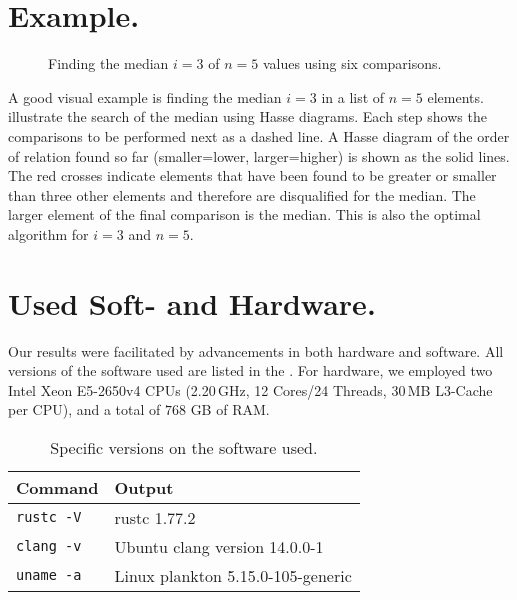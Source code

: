 \documentclass[twoside,leqno,twocolumn]{article}
\begin{document}
\clearpage
\appendix


\section{Example.}
\begin{figure}[!b]
  \centering
  
  \caption{Finding the median $i = 3$ of $n = 5$ values using six comparisons.}
  \label{fig:median_of_5}
\end{figure}
A good visual example is finding the median $i = 3$ in a list of $n = 5$ elements.
 illustrate the search of the median using Hasse diagrams.
Each step shows the comparisons to be performed next as a dashed line.
A Hasse diagram of the order of relation found so far (smaller=lower, larger=higher) is shown as the solid lines.
The red crosses indicate elements that have been found to be greater or smaller than three other elements and therefore are disqualified for the median.
The larger element of the final comparison is the median.
This is also the optimal algorithm for $i = 3$ and $n = 5$.






\section{Used Soft- and Hardware.} \label{sec:hardware}

Our results were facilitated by advancements in both hardware and software.
All versions of the software used are listed in the .
For hardware, we employed two Intel Xeon E5-2650v4 CPUs (2.20\,GHz, 12 Cores/24 Threads, 30\,MB L3-Cache per CPU), and a total of $768$ GB of RAM.

\begin{table}[!t]
  \renewcommand{\arraystretch}{1.1}
  \caption{Specific versions on the software used.}
  \label{table:command_outputs}
  \centering
  \small
  \begin{tabular}{l|l}
    \textbf{Command}  & \textbf{Output}                   \\ \hline
    \texttt{rustc -V} & rustc 1.77.2                      \\ \hline
    \texttt{clang -v} & Ubuntu clang version 14.0.0-1     \\ \hline
    \texttt{uname -a} & Linux plankton 5.15.0-105-generic \\
  \end{tabular}
\end{table}
  
\end{document}
